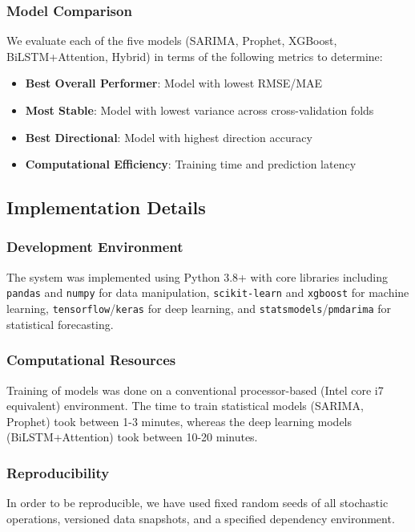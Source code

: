 \documentclass[12pt,a4paper]{article}
\begin{document}
\subsubsection{Model Comparison}

We evaluate each of the five models (SARIMA, Prophet, XGBoost, BiLSTM+Attention, Hybrid) in terms of the following metrics to determine:
\begin{itemize}
    \item \textbf{Best Overall Performer}: Model with lowest RMSE/MAE
    \item \textbf{Most Stable}: Model with lowest variance across cross-validation folds
    \item \textbf{Best Directional}: Model with highest direction accuracy
    \item \textbf{Computational Efficiency}: Training time and prediction latency
\end{itemize}

\subsection{Implementation Details}

\subsubsection{Development Environment}
The system was implemented using Python 3.8+ with core libraries including \texttt{pandas} and \texttt{numpy} for data manipulation, \texttt{scikit-learn} and \texttt{xgboost} for machine learning, \texttt{tensorflow}/\texttt{keras} for deep learning, and \texttt{statsmodels}/\texttt{pmdarima} for statistical forecasting.

\subsubsection{Computational Resources}
Training of models was done on a conventional processor-based (Intel core i7 equivalent) environment. The time to train statistical models (SARIMA, Prophet) took between 1-3 minutes, whereas the deep learning models (BiLSTM+Attention) took between 10-20 minutes.

\subsubsection{Reproducibility}
In order to be reproducible, we have used fixed random seeds of all stochastic operations, versioned data snapshots, and a specified dependency environment.
\end{document}
